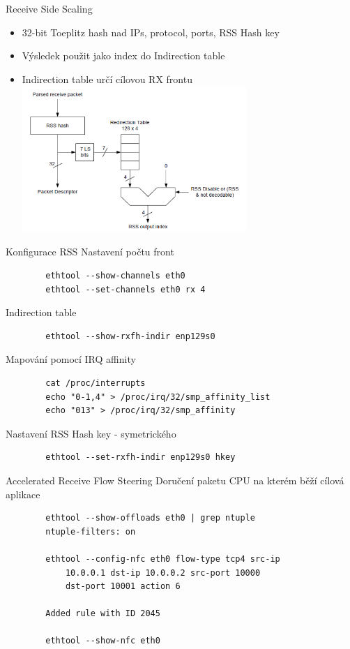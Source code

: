 \documentclass{beamer}
\begin{document}
\begin{frame}{Receive Side Scaling}
	\begin{itemize}
		\item 32-bit Toeplitz hash nad IPs, protocol, ports, RSS Hash key
		\item Výsledek použit jako index do Indirection table
		\item Indirection table určí cílovou RX frontu \\
		\includegraphics[width=8.5cm,keepaspectratio]{fig/rss.png}
	\end{itemize}
\end{frame}

\begin{frame}[fragile]{Konfigurace RSS}
	Nastavení počtu front
		\begin{lstlisting}
		ethtool --show-channels eth0
		ethtool --set-channels eth0 rx 4
		\end{lstlisting}
	Indirection table
		\begin{lstlisting}
		ethtool --show-rxfh-indir enp129s0
		\end{lstlisting}
	Mapování pomocí IRQ affinity
		\begin{lstlisting}
		cat /proc/interrupts
		echo "0-1,4" > /proc/irq/32/smp_affinity_list
		echo "013" > /proc/irq/32/smp_affinity
		\end{lstlisting}
	Nastavení RSS Hash key - symetrického
		\begin{lstlisting}
		ethtool --set-rxfh-indir enp129s0 hkey
		\end{lstlisting}
\end{frame}

\begin{frame}[fragile]{Accelerated Receive Flow Steering}
	Doručení paketu CPU na kterém běží cílová aplikace
		\begin{lstlisting}
		ethtool --show-offloads eth0 | grep ntuple
		ntuple-filters: on

		ethtool --config-nfc eth0 flow-type tcp4 src-ip
			10.0.0.1 dst-ip 10.0.0.2 src-port 10000
			dst-port 10001 action 6

		Added rule with ID 2045

		ethtool --show-nfc eth0
		\end{lstlisting}
\end{frame}
\end{document}
